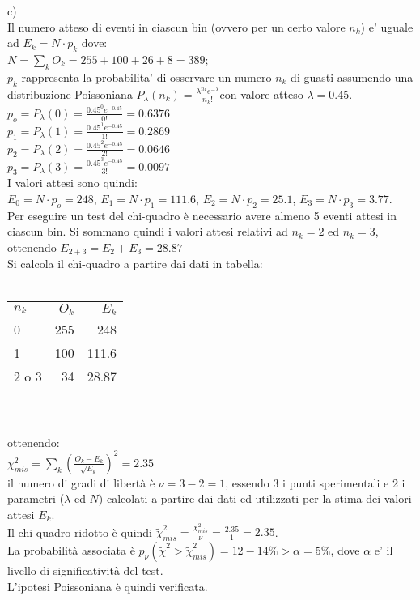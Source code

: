 \documentclass[10pt,a4paper,fleqn]{article}
\begin{document}
 c) \\
Il numero atteso di eventi in ciascun bin (ovvero per un certo
valore $n_k$) e' uguale ad $E_k=N\cdot p_k$ dove:\\
$N=\sum_k O_k=255+100+26+8=389$;\\
$p_k$ rappresenta la probabilita' di osservare un numero $n_k$ di
guasti assumendo una distribuzione Poissoniana
$P_{\lambda}(n_k)=\frac{\lambda^{n_k} e^{-\lambda}}{n_k!}$con valore atteso
$\lambda=0.45$.\\
$p_o=P_{\lambda}(0)=\frac{0.45^{0} e^{-0.45}}{0!}=0.6376$\\
$p_1=P_{\lambda}(1)=\frac{0.45^{1} e^{-0.45}}{1!}=0.2869$\\
$p_2=P_{\lambda}(2)=\frac{0.45^{2} e^{-0.45}}{2!}=0.0646$\\
$p_3=P_{\lambda}(3)=\frac{0.45^{3} e^{-0.45}}{3!}=0.0097$\\
I valori attesi sono quindi:\\
$E_0=N \cdot p_o=248$,
$E_1=N \cdot p_1=111.6$,
$E_2=N \cdot p_2=25.1$,
$E_3=N \cdot p_3=3.77$.\\


Per eseguire un test del chi-quadro \`e necessario avere almeno 5
eventi attesi in ciascun bin. Si sommano quindi i valori attesi relativi ad
$n_k=2$ ed $n_k=3$, ottenendo $E_{2+3}=E_2+E_3=28.87$\\

Si calcola il chi-quadro a partire dai dati in tabella: 
~\\~\\
\begin{tabular}{|l|r|r|}
\hline
$n_k$ & $O_k$ & $E_k$  \\
0        & 255 & 248  \\
1        & 100 & 111.6  \\
2 o 3  & 34 & 28.87  \\
\hline
\end{tabular}~\\~\\
ottenendo:\\
$\chi^2_{mis}=\sum_k \left(
  \frac{O_k-E_k}{\sqrt{E_k}}\right)^2=2.35$\\
il numero di gradi di libert\`a \`e $\nu=3-2=1$, essendo 3 i punti
sperimentali e 2 i parametri ($\lambda$ ed $N$) calcolati a partire
dai dati ed utilizzati per la stima dei valori attesi $E_k$.\\
Il chi-quadro ridotto \`e quindi
$\tilde{\chi}^2_{mis}=\frac{\chi^2_{mis}}{\nu}=\frac{2.35}{1}=2.35$.\\
La probabilit\`a associata \`e
$p_{\nu}(\tilde{\chi}^2>\tilde{\chi}^2_{mis})=12-14\%>\alpha=5\%$,
dove $\alpha$ e' il livello di significativit\`a del test.\\
L'ipotesi Poissoniana \`e quindi verificata.\\
\end{document}
